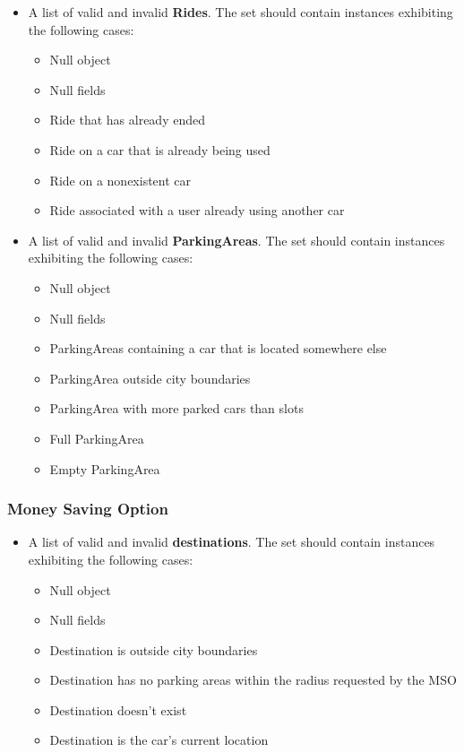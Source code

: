 		\begin{itemize}
			\item A list of valid and invalid \textbf{Rides}. The set should contain instances exhibiting the following cases:
				\begin{itemize}
					\item Null object
					\item Null fields
					\item Ride that has already ended
					\item Ride on a car that is already being used
					\item Ride on a nonexistent car
					\item Ride associated with a user already using another car
				\end{itemize}
		\end{itemize}
		
		\begin{itemize}
			\item A list of valid and invalid \textbf{ParkingAreas}. The set should contain instances exhibiting the following cases:
				\begin{itemize}
					\item Null object
					\item Null fields
					\item ParkingAreas containing a car that is located somewhere else
					\item ParkingArea outside city boundaries
					\item ParkingArea with more parked cars than slots
					\item Full ParkingArea
					\item Empty ParkingArea
				\end{itemize}
		\end{itemize}
		
		
		
		\subsubsection{Money Saving Option}
		
		\begin{itemize}
			\item A list of valid and invalid \textbf{destinations}. The set should contain instances exhibiting the following cases:
				\begin{itemize}
					\item Null object
					\item Null fields
					\item Destination is outside city boundaries
					\item Destination has no parking areas within the radius requested by the MSO
					\item Destination doesn't exist
					\item Destination is the car's current location
				\end{itemize}
		\end{itemize}
		
